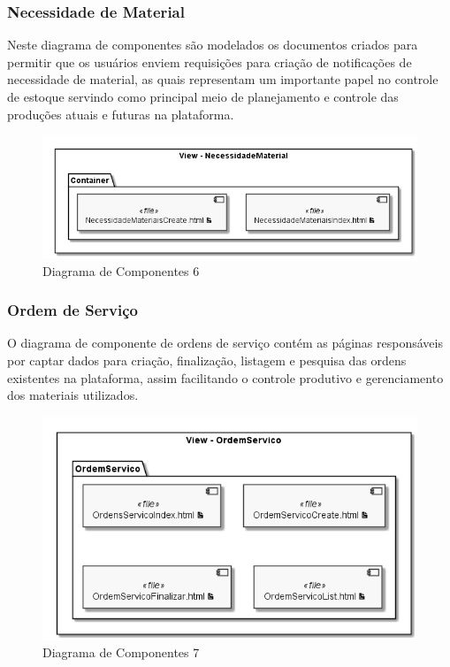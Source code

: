 \documentclass[rascunho,xindy,acronym,symbols]{fei}
\begin{document}
\subsubsection{Necessidade de Material}

Neste diagrama de componentes são modelados os documentos criados para permitir que os usuários enviem requisições para criação de notificações de necessidade de material, as quais representam um importante papel no controle de estoque servindo como principal meio de planejamento e controle das produções atuais e futuras na plataforma.

\begin{figure}[H]
    \centering
    \includegraphics[scale=0.6, width=400pt]{./Images/Diagrama_de_Componentes_-_NecessidadeMaterial.png}
    \caption{Diagrama de Componentes 6}
    \label{fig:diag_componentes6}
\end{figure}

\subsubsection{Ordem de Serviço}

O diagrama de componente de ordens de serviço contém as páginas responsáveis por captar dados para criação, finalização, listagem e pesquisa das ordens existentes na plataforma, assim facilitando o controle produtivo e gerenciamento dos materiais utilizados.

\begin{figure}[H]
    \centering
    \includegraphics[scale=0.6, width=400pt]{./Images/Diagrama_de_Componentes_-_OrdemServico.png}
    \caption{Diagrama de Componentes 7}
    \label{fig:diag_componentes7}
\end{figure}
\end{document}
